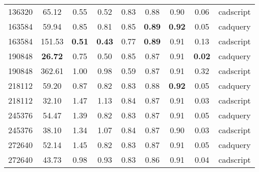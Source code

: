 \begin{table}[ht]
\begin{tabular}{c c c c c c c c c}
		136320              & 65.12                  & 0.55                   & 0.52                    & 0.83                    & 0.88                    & 0.90                     & 0.06                  & cadscript \\
		163584              & 59.94                  & 0.85                   & 0.81                    & 0.85                    & \textbf{0.89}           & \textbf{0.92}            & 0.05                  & cadquery  \\
		163584              & 151.53                 & \textbf{0.51}          & \textbf{0.43}           & 0.77                    & \textbf{0.89}           & 0.91                     & 0.13                  & cadscript \\
		190848              & \textbf{26.72}         & 0.75                   & 0.50                    & 0.85                    & 0.87                    & 0.91                     & \textbf{0.02}         & cadquery  \\
		190848              & 362.61                 & 1.00                   & 0.98                    & 0.59                    & 0.87                    & 0.91                     & 0.32                  & cadscript \\
		218112              & 59.20                  & 0.87                   & 0.82                    & 0.83                    & 0.88                    & \textbf{0.92}            & 0.05                  & cadquery  \\
		218112              & 32.10                  & 1.47                   & 1.13                    & 0.84                    & 0.87                    & 0.91                     & 0.03                  & cadscript \\
		245376              & 54.47                  & 1.39                   & 0.82                    & 0.83                    & 0.87                    & 0.91                     & 0.05                  & cadquery  \\
		245376              & 38.10                  & 1.34                   & 1.07                    & 0.84                    & 0.87                    & 0.90                     & 0.03                  & cadscript \\
		272640              & 52.14                  & 1.45                   & 0.82                    & 0.83                    & 0.87                    & 0.91                     & 0.05                  & cadquery  \\
		272640              & 43.73                  & 0.98                   & 0.93                    & 0.83                    & 0.86                    & 0.91                     & 0.04                  & cadscript \\
		\hline
	\end{tabular}
\end{table}


